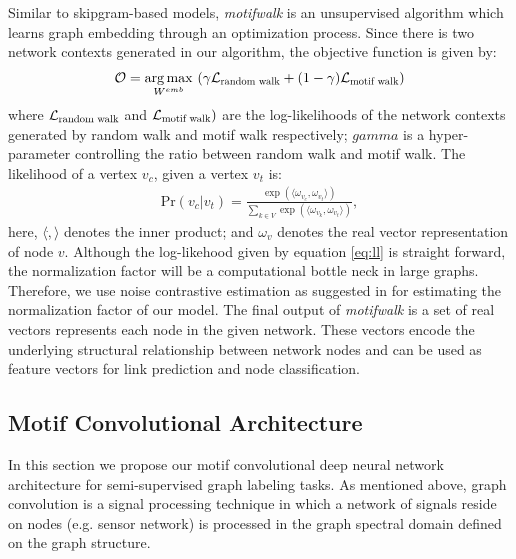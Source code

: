 \documentclass{article}
\DeclareMathOperator*{\argmax}{arg\,max}
\theoremstyle{definition}
\begin{document}
Similar to skipgram-based models, \emph{motifwalk} is an unsupervised algorithm which 
learns graph embedding through an optimization process. Since there is two 
network contexts generated in our algorithm, the objective function is given by:
\begin{equation} \label{eq:mloss}
\begin{aligned}
&\mathcal{O} = \argmax_{W^{emb}}\ (\gamma \mathcal{L}_{\scalebox{0.75}{random walk}} + (1-\gamma) \mathcal{L}_{\scalebox{0.75}{motif walk}}) \\
\end{aligned}
\end{equation}
where $\mathcal{L}_{\scalebox{0.75}{random walk}}$ and $\mathcal{L}_{\scalebox{0.75}{motif walk}})$
are the log-likelihoods of the network contexts generated by
random walk and motif walk respectively; $gamma$ is a hyper-parameter
controlling the ratio between random walk and motif walk. The likelihood
of a vertex $v_c$, given a vertex $v_t$ is:
\begin{equation} \label{eq:ll}
\begin{aligned}
    \mbox{Pr} (v_c | v_t) = \frac{\exp{( \langle \omega_{v_c} ,  \omega_{v_t} \rangle )}}{\sum_{k \in V} \exp{( \langle \omega_{v_k} ,  \omega_{v_t} \rangle )}},
\end{aligned}
\end{equation}
here, $\langle \dot , \rangle$ denotes the inner product; and $\omega_v$ denotes
the real vector representation of node $v$. Although the log-likehood given
by equation \ref{eq:ll} is straight forward, the normalization factor will be
a computational bottle neck in large graphs. Therefore, we use noise contrastive
estimation as suggested in \cite{skipgram,node2vec} for estimating the normalization
factor of our model. The final output of \emph{motifwalk} is a set of real vectors
represents each node in the given network. These vectors encode the underlying
structural relationship between network nodes and can be used as feature vectors
for link prediction and node classification.

\subsection{Motif Convolutional Architecture}

In this section we propose our motif convolutional deep
neural network architecture for semi-supervised graph labeling
tasks. As mentioned above, graph convolution is a signal processing technique in which
a network of signals reside on nodes (e.g. sensor network) is
processed in the graph spectral domain defined on the graph structure.
\end{document}
